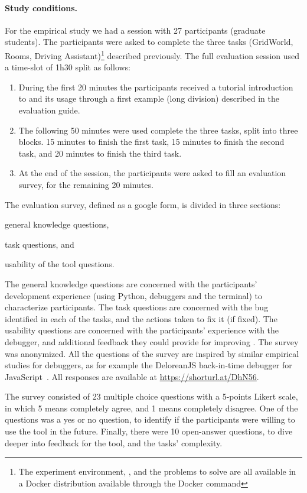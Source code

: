 \paragraph{\textbf{Study conditions.}}
For the empirical study we had a session with 27 participants (\ie graduate students). 
The participants were asked to complete the three tasks (\ie GridWorld, Rooms, Driving Assistant)\footnote{The experiment environment, \flik, and the problems to solve are all available in a Docker distribution available through the Docker command } 
described previously. The full evaluation session used a time-slot of 1h30 split as follows: 
\begin{enumerate}[label=\textbf{\arabic*.}]
  \item During the first 20 minutes the participants received a tutorial introduction to \flik and its 
  usage through a first example (long division) described in the evaluation guide.
  \item The following 50 minutes were used complete the three tasks, split into three blocks. 15 minutes 
  to finish the first task, 15 minutes to finish the second task, and  20 minutes to finish the third task. 
  \item At the end of the session, the participants were asked to fill an evaluation survey, for the 
  remaining 20 minutes. 
\end{enumerate}

The evaluation survey, defined as a google form, is divided in three sections: 
\begin{enumerate*}[label=(\arabic*)]
\item general knowledge questions, 
\item task questions, and 
\item usability of the tool questions.
\end{enumerate*}
The general knowledge questions are concerned with the participants' development experience 
(\ie using Python, debuggers and the terminal) to characterize participants. The task questions are 
concerned with the bug identified in each of the tasks, and the actions taken to fix it (if fixed). The 
usability questions are concerned with the participants' experience with the debugger, and additional 
feedback they could provide for improving \flik. The survey was anonymized. All the questions of the 
survey are inspired by similar empirical studies for debuggers, as for example the DeloreanJS 
back-in-time debugger for JavaScript~\cite{leger23}. All responses are available 
at \url{https://shorturl.at/DhN56}. 

The survey consisted of 23 multiple choice questions with a 5-points Likert scale, in which 5 means 
completely agree, and 1 means completely disagree. One of the questions was a yes or no question, 
to identify if the participants were willing to use the tool in the future. Finally, there were 10 open-answer 
questions, to dive deeper into feedback for the tool, and the tasks' complexity.


\endinput

